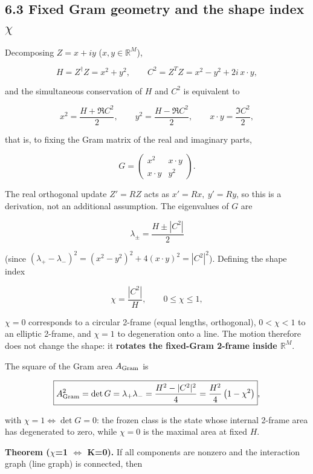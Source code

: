 \documentclass[
  a4paper,
]{article}
\begin{document}
\subsection{\texorpdfstring{6.3 Fixed Gram geometry and the shape index
\(\chi\)}{6.3 Fixed Gram geometry and the shape index \textbackslash chi}}\label{fixed-gram-geometry-and-the-shape-index-chi}

Decomposing \(Z=x+iy\) (\(x,y\in\mathbb R^M\)),

\[
H=Z^\dagger Z=x^2+y^2,
\qquad
C^2=Z^TZ=x^2-y^2+2i\,x\cdot y,
\]

and the simultaneous conservation of \(H\) and \(C^2\) is equivalent to

\[
x^2=\frac{H+\Re C^2}{2},
\qquad
y^2=\frac{H-\Re C^2}{2},
\qquad
x\cdot y=\frac{\Im C^2}{2},
\]

that is, to fixing the Gram matrix of the real and imaginary parts,

\[
G=
\begin{pmatrix}
x^2 & x\cdot y\\
x\cdot y & y^2
\end{pmatrix}.
\]

The real orthogonal update \(Z'=RZ\) acts as \(x'=Rx,\ y'=Ry\), so this
is a derivation, not an additional assumption. The eigenvalues of \(G\)
are

\[
\boxed{\lambda_\pm=\frac{H\pm|C^2|}{2}}
\]

(since \((\lambda_+-\lambda_-)^2=(x^2-y^2)^2+4(x\cdot y)^2=|C^2|^2\)).
Defining the shape index

\[
\boxed{\chi=\frac{|C^2|}{H}},
\qquad
0\le\chi\le1,
\]

\(\chi=0\) corresponds to a circular 2-frame (equal lengths,
orthogonal), \(0<\chi<1\) to an elliptic 2-frame, and \(\chi=1\) to
degeneration onto a line. The motion therefore does not change the
shape: it \textbf{rotates the fixed-Gram 2-frame inside
\(\mathbb R^M\)}.

The square of the Gram area \(A_{\rm Gram}\) is

\[
\boxed{
A_{\rm Gram}^2=\det G=\lambda_+\lambda_-=\frac{H^2-|C^2|^2}{4}=\frac{H^2}{4}\left(1-\chi^2\right)
},
\]

with \(\chi=1\iff\det G=0\): the frozen class is the state whose
internal 2-frame area has degenerated to zero, while \(\chi=0\) is the
maximal area at fixed \(H\).

\textbf{Theorem (\(\chi\)=1 \(\iff\) K=0).} If all components are
nonzero and the interaction graph (line graph) is connected, then
\end{document}
